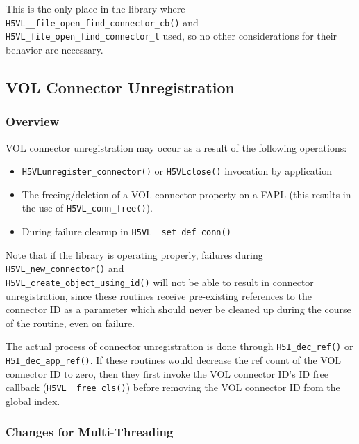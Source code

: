 \documentclass{article}
\begin{document}
This is the only place in the library where \texttt{H5VL\_\_file\_open\_find\_connector\_cb()} and \\\texttt{H5VL\_file\_open\_find\_connector\_t} used, so no other considerations for their behavior are necessary.

\subsection{VOL Connector Unregistration}
\label{sec:unregistration}

\subsubsection{Overview}

VOL connector unregistration may occur as a result of the following operations:
\begin{itemize}
    \item \texttt{H5VLunregister\_connector()} or \texttt{H5VLclose()} invocation by application

    \item The freeing/deletion of a VOL connector property on a FAPL (this results in the use of \texttt{H5VL\_conn\_free()}).

    \item During failure cleanup in \texttt{H5VL\_\_set\_def\_conn()}
\end{itemize}

Note that if the library is operating properly, failures during \texttt{H5VL\_new\_connector()} and \\ \texttt{H5VL\_create\_object\_using\_id()} will not be able to result in connector unregistration, since these routines receive pre-existing references to the connector ID as a parameter which should never be cleaned up during the course of the routine, even on failure.

The actual process of connector unregistration is done through \texttt{H5I\_dec\_ref()} or \texttt{H5I\_dec\_app\_ref()}. If these routines would decrease the ref count of the VOL connector ID to zero, then they first invoke the VOL connector ID's ID free callback (\texttt{H5VL\_\_free\_cls()}) before removing the VOL connector ID from the global index.

\subsubsection{Changes for Multi-Threading}
\end{document}
